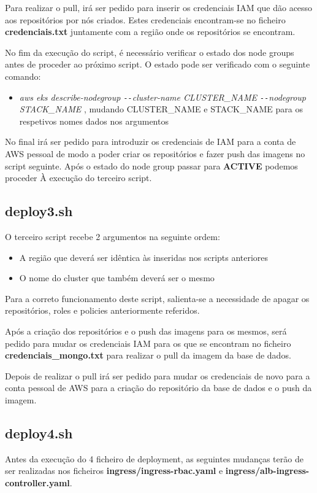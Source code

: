 \documentclass[11pt,a4paper]{article}
\begin{document}
Para realizar o pull, irá ser pedido para inserir os credenciais IAM que dão acesso aos repositórios por nós criados. Estes credenciais encontram-se no ficheiro \textbf{credenciais.txt} juntamente com a região onde os repositórios se encontram.

No fim da execução do script, é necessário verificar o estado dos node groups antes de proceder ao próximo script. O estado pode ser verificado com o seguinte comando: 
\begin{itemize}
	\item \textit{aws eks describe-nodegroup \texttt{-{}-}cluster-name CLUSTER\_NAME \texttt{-{}-}nodegroup STACK\_NAME} , mudando CLUSTER\_NAME e STACK\_NAME para os respetivos nomes dados nos argumentos
\end{itemize}
No final irá ser pedido para introduzir os credenciais de IAM para a conta de AWS pessoal de modo a poder criar os repositórios e fazer push das imagens no script seguinte.
Após o estado do node group passar para \textbf{ACTIVE} podemos proceder À execução do terceiro script.

\subsection{deploy3.sh}
O terceiro script recebe 2 argumentos na seguinte ordem:
\begin{itemize}
	\item A região que deverá ser idêntica às inseridas nos scripts anteriores
	\item O nome do cluster que também deverá ser o mesmo
\end{itemize}
Para a correto funcionamento deste script, salienta-se a necessidade de apagar os repositórios, roles e policies anteriormente referidos.

Após a criação dos repositórios e o push das imagens para os mesmos, será pedido para mudar os credenciais IAM para os que se encontram no ficheiro \textbf{credenciais\_mongo.txt} para realizar o pull da imagem da base de dados.

Depois de realizar o pull irá ser pedido para mudar os credenciais de novo para a conta pessoal de AWS para a criação do repositório da base de dados e o push da imagem.

\subsection{deploy4.sh}
Antes da execução do 4 ficheiro de deployment, as seguintes mudanças terão de ser realizadas nos ficheiros \textbf{ingress/ingress-rbac.yaml} e \textbf{ingress/alb-ingress-controller.yaml}.
\end{document}
